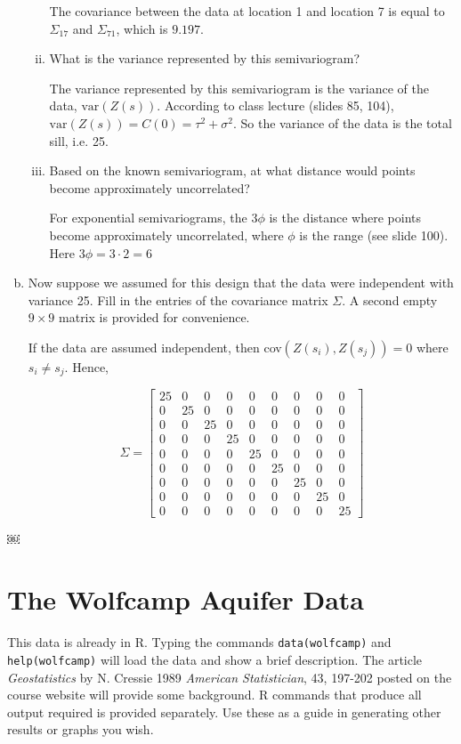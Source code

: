\documentclass[letterpaper, 12pt]{article}\usepackage[]{graphicx}\usepackage[]{color}
\newcommand{\var}{\text{var}}
\begin{document}
\begin{enumerate}[a.]
\begin{enumerate}[(i)]
\textsf{The covariance between the data at location 1 and location 7 is equal to $\Sigma_{17}$ and $\Sigma_{71}$, which is $9.197$.}
\item
What is the variance represented by this semivariogram?

\textsf{The variance represented by this semivariogram is the variance of the data, $\var(Z(s))$. According to class lecture (slides 85, 104), $\var(Z(s)) = C(0) = \tau^2 + \sigma^2$. So the variance of the data is the total sill, i.e. 25.}
\item
Based on the known semivariogram, at what distance would points become approximately uncorrelated?

\textsf{For exponential semivariograms, the $3\phi$ is the distance where points become approximately uncorrelated, where $\phi$ is the range (see slide 100). Here $3\phi = 3\cdot 2= 6
$}
\end{enumerate}
\item
Now suppose we assumed for this design that the data were independent with variance 25. Fill in the entries of the covariance matrix $\Sigma$. A second empty $9 \times 9$ matrix is provided for convenience.

{\sf
If the data are assumed independent, then cov$(Z(s_i),Z(s_j)) = 0$ where $s_i \neq s_j$. Hence,
}


\[
\Sigma = \begin{bmatrix}
 25 & 0 & 0 & 0 & 0 & 0 & 0 & 0 & 0 \\
 0 & 25 & 0 & 0 & 0 & 0 & 0 & 0 & 0 \\
 0 & 0 & 25 & 0 & 0 & 0 & 0 & 0 & 0 \\
 0 & 0 & 0 & 25 & 0 & 0 & 0 & 0 & 0 \\
 0 & 0 & 0 & 0 & 25 & 0 & 0 & 0 & 0 \\
 0 & 0 & 0 & 0 & 0 & 25 & 0 & 0 & 0 \\
 0 & 0 & 0 & 0 & 0 & 0 & 25 & 0 & 0 \\
 0 & 0 & 0 & 0 & 0 & 0 & 0 & 25 & 0 \\
 0 & 0 & 0 & 0 & 0 & 0 & 0 & 0 & 25\end{bmatrix}\]

\end{enumerate}
￼

\section{The Wolfcamp Aquifer Data}

This data is already in R. Typing the commands \texttt{data(wolfcamp)} and \texttt{help(wolfcamp)} will load the data and show a brief description. The article \textit{Geostatistics} by N. Cressie 1989 \textit{American Statistician}, 43, 197-202 posted on the course website will provide some background. R commands that produce all output required is provided separately. Use these as a guide in generating other results or graphs you wish.
\end{document}
